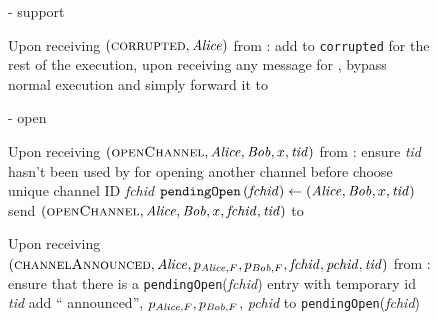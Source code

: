 \begin{figure}[H]
\begin{systembox}{\fpaynet{} - support}
\begin{algorithmic}[1]
        \State Upon receiving $\left(\textsc{corrupted}, \mathit{Alice}\right)$ from
        \simulator:
        \Indent
          \State add \alice{} to \texttt{corrupted}
          \State for the rest of the execution, upon receiving any message for
          \alice{}, bypass normal execution and simply forward it to
          \simulator
        \EndIndent
      \end{algorithmic}
    \end{systembox}
    \caption{}
    \label{alg:fpaynet:support}
  \end{figure}

  \begin{figure}[H]
    \begin{systembox}{\fpaynet{} - open}
      \begin{algorithmic}[1]
        \State Upon receiving $\left(\textsc{openChannel}, \mathit{Alice}, \mathit{Bob}, x,
        \mathit{tid}\right)$ from \alice:
        \Indent
          \State ensure \textit{tid} hasn't been used by \alice{} for opening
          another channel before
          \label{alg:fpaynet:open:valid}
          \State choose unique channel ID \textit{fchid}
          \State $\mathtt{pendingOpen}\left(\mathit{fchid}\right) \gets
          \left(\mathit{Alice}, \mathit{Bob}, x, \mathit{tid}\right)$
          \State send $\left(\textsc{openChannel}, \mathit{Alice}, \mathit{Bob}, x,
          \mathit{fchid}, \mathit{tid}\right)$ to \simulator
        \EndIndent
        \Statex

        \State Upon receiving $\left(\textsc{channelAnnounced}, \mathit{Alice},
        p_{\mathit{Alice}, F}, p_{\mathit{Bob}, F}, \mathit{fchid}, \mathit{pchid},
        \mathit{tid}\right)$ from \simulator:
        \Indent
          \State ensure that there is a \texttt{pendingOpen}(\textit{fchid})
          entry with temporary id \textit{tid}
          \label{alg:fpaynet:announced:valid}
          \State add ``\alice{} announced'', $p_{\mathit{Alice}, F}, p_{\mathit{Bob}, F}$,
          \textit{pchid} to \texttt{pendingOpen}(\textit{fchid})
          \label{alg:fpaynet:announced:add}
        \EndIndent
        \Statex


\end{algorithmic}
\end{systembox}
\end{figure}
